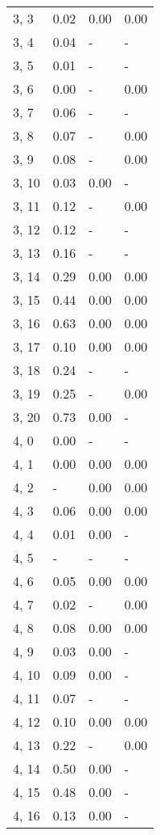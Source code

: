 \begin{table}
\begin{tabular}{llll}
3, 3   &    0.02 &  0.00 &  0.00 \\
3, 4   &    0.04 &     - &     - \\
3, 5   &    0.01 &     - &     - \\
3, 6   &    0.00 &     - &  0.00 \\
3, 7   &    0.06 &     - &     - \\
3, 8   &    0.07 &     - &  0.00 \\
3, 9   &    0.08 &     - &  0.00 \\
3, 10  &    0.03 &  0.00 &     - \\
3, 11  &    0.12 &     - &  0.00 \\
3, 12  &    0.12 &     - &     - \\
3, 13  &    0.16 &     - &     - \\
3, 14  &    0.29 &  0.00 &  0.00 \\
3, 15  &    0.44 &  0.00 &  0.00 \\
3, 16  &    0.63 &  0.00 &  0.00 \\
3, 17  &    0.10 &  0.00 &  0.00 \\
3, 18  &    0.24 &     - &     - \\
3, 19  &    0.25 &     - &  0.00 \\
3, 20  &    0.73 &  0.00 &     - \\
4, 0   &    0.00 &     - &     - \\
4, 1   &    0.00 &  0.00 &  0.00 \\
4, 2   &       - &  0.00 &  0.00 \\
4, 3   &    0.06 &  0.00 &  0.00 \\
4, 4   &    0.01 &  0.00 &     - \\
4, 5   &       - &     - &     - \\
4, 6   &    0.05 &  0.00 &  0.00 \\
4, 7   &    0.02 &     - &  0.00 \\
4, 8   &    0.08 &  0.00 &  0.00 \\
4, 9   &    0.03 &  0.00 &     - \\
4, 10  &    0.09 &  0.00 &     - \\
4, 11  &    0.07 &     - &     - \\
4, 12  &    0.10 &  0.00 &  0.00 \\
4, 13  &    0.22 &     - &  0.00 \\
4, 14  &    0.50 &  0.00 &     - \\
4, 15  &    0.48 &  0.00 &     - \\
4, 16  &    0.13 &  0.00 &     - \\

\end{tabular}
\end{table}
